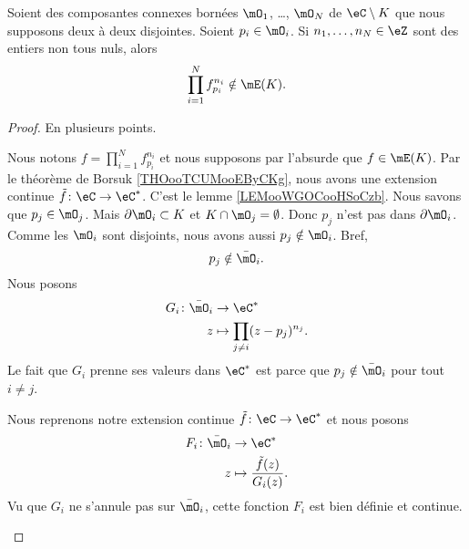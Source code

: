 \begin{lemma}     \label{LEMooOTMGooZeUoCy}
    Soient des composantes connexes bornées \( \mO_1\), \ldots, \( \mO_N\) de \( \eC\setminus K\) que nous supposons deux à deux disjointes. Soient \( p_i\in\mO_i\). Si \( n_1,\ldots, n_N\in \eZ\) sont des entiers non tous nuls, alors
    \begin{equation}
        \prod_{i=1}^Nf_{p_i}^{n_i}\notin\mE(K).
    \end{equation}
\end{lemma}

\begin{proof}
    En plusieurs points.
    \begin{subproof}
    Nous notons \( f=\prod_{i=1}^Nf_{p_i}^{n_i}\) et nous supposons par l'absurde que \( f\in\mE(K)\). Par le théorème de Borsuk \ref{THOooTCUMooEByCKg}, nous avons une extension continue \( \tilde f\colon \eC \to \eC^*\).
    C'est le lemme \ref{LEMooWGOCooHSoCzb}.
    Nous savons que \( p_j\in\mO_j\). Mais \( \partial\mO_i\subset K\) et \( K\cap\mO_j=\emptyset\). Donc \( p_j\) n'est pas dans \( \partial\mO_i\). Comme les \( \mO_i\) sont disjoints, nous avons aussi \( p_j\notin \mO_i\). Bref,
    \begin{equation}
        p_j\notin\bar\mO_i.
    \end{equation}
    Nous posons
    \begin{equation}
        \begin{aligned}
            G_i\colon \bar\mO_i&\to \eC^* \\
            z&\mapsto \prod_{j\neq i}(z-p_j)^{n_j}. 
        \end{aligned}
    \end{equation}
    Le fait que \( G_i\) prenne ses valeurs dans \( \eC^*\) est parce que \( p_j\notin \bar\mO_i\) pour tout \( i\neq j\).

    Nous reprenons notre extension continue \( \tilde f\colon \eC\to \eC^*\) et nous posons
    \begin{equation}
        \begin{aligned}
            F_i\colon \bar\mO_i&\to \eC^* \\
            z&\mapsto \frac{ \tilde f(z) }{ G_i(z) }. 
        \end{aligned}
    \end{equation}
    Vu que \( G_i\) ne s'annule pas sur \( \bar\mO_i\), cette fonction \( F_i\) est bien définie et continue.


\end{subproof}
\end{proof}
